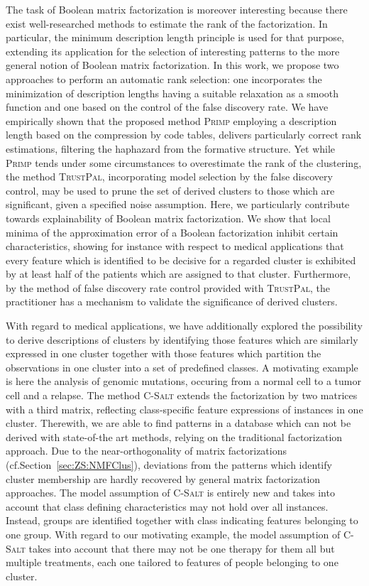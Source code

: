 The task of Boolean matrix factorization is moreover interesting because there exist well-researched methods to estimate the rank of the factorization. In particular, the minimum description length principle is used for that purpose, extending its application for the selection of interesting patterns to the more general notion of Boolean matrix factorization. In this work, we propose two approaches to perform an automatic rank selection: one incorporates the minimization of description lengths having a suitable relaxation as a smooth \KL function and one based on the control of the false discovery rate. We have empirically shown that the proposed method \textsc{Primp} employing a description length based on the compression by code tables, delivers particularly correct rank estimations, filtering the haphazard from the formative structure. Yet while \textsc{Primp} tends under some circumstances to overestimate the rank of the clustering, the method \textsc{TrustPal}, incorporating model selection by the false discovery control, may be used to prune the set of derived clusters to those which are significant, given a specified noise assumption. Here, we particularly contribute towards explainability of Boolean matrix factorization. We show that local minima of the approximation error of a Boolean factorization inhibit certain characteristics, showing for instance with respect to medical applications that every feature which is identified to be decisive for a regarded cluster is exhibited by at least half of the patients which are assigned to that cluster. Furthermore, by the method of false discovery rate control provided with \textsc{TrustPal}, the practitioner has a mechanism to validate the significance of derived clusters.

With regard to medical applications, we have additionally explored the possibility to derive descriptions of clusters by identifying those features which are similarly expressed in one cluster together with those features which partition the observations in one cluster into a set of predefined classes. A motivating example is here the analysis of genomic mutations, occuring from a normal cell to a tumor cell and a relapse. The method \textsc{C-Salt} extends the factorization by two matrices with a third matrix, reflecting class-specific feature expressions of instances in one cluster. Therewith, we are able to find patterns in a database which can not be derived with state-of-the art methods, relying on the traditional factorization approach. Due to the near-orthogonality of matrix factorizations (cf.\@ Section~\ref{sec:ZS:NMFClus}), deviations from the patterns which identify cluster membership are hardly recovered by general matrix factorization approaches. The model assumption of \textsc{C-Salt} is entirely new and takes into account that class defining characteristics may not hold over all instances. Instead, groups are identified together with class indicating features belonging to one group. With regard to our motivating example, the model assumption of \textsc{C-Salt} takes into account that there may not be one therapy for them all but multiple treatments, each one tailored to features of people belonging to one cluster.
